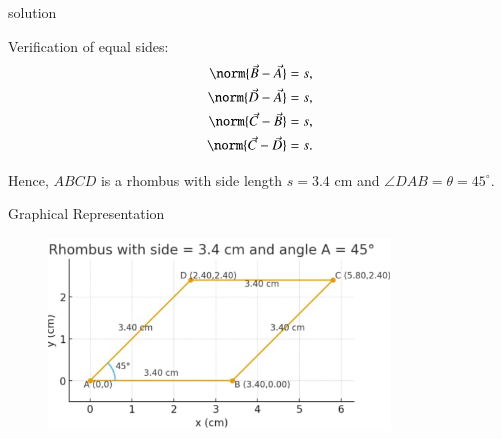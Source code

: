 \documentclass{beamer}
\begin{document}
\begin{frame}[allowframebreaks]{solution}
\framebreak %

\noindent
Verification of equal sides:
\begin{align}
    \norm{\vec{B}-\vec{A}} &= s,                        \label{eq:check1}\\
    \norm{\vec{D}-\vec{A}} &= s,                        \label{eq:check2}\\
    \norm{\vec{C}-\vec{B}} &= s,                        \label{eq:check3}\\
    \norm{\vec{C}-\vec{D}} &= s.                        \label{eq:check4}
\end{align}

\noindent
Hence, $ABCD$ is a rhombus with side length $s=3.4$ cm and $\angle DAB = \theta = 45^\circ$.
\end{frame}

\begin{frame}{Graphical Representation}
   \begin{figure}[h!]
\centering
\includegraphics[width=0.6\linewidth]{fig3.4.5.png}
\end{figure}
\end{frame}
\end{document}
